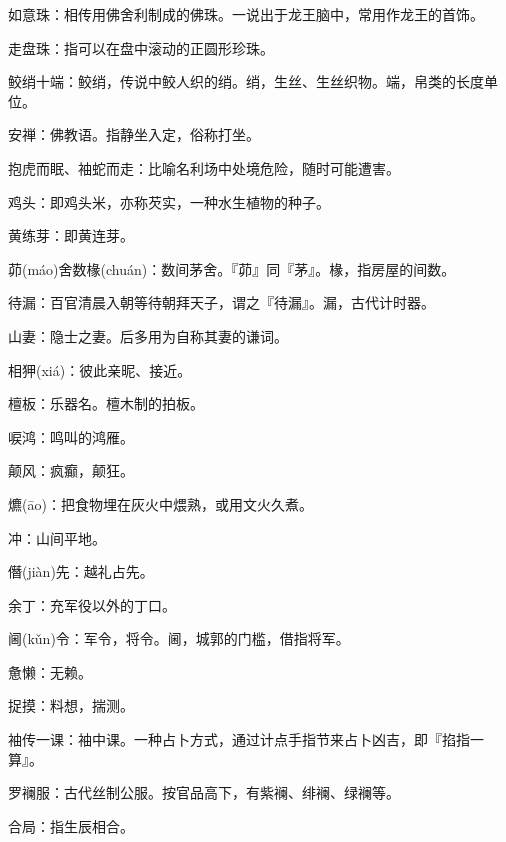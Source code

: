 \startbuffer[381]
如意珠：相传用佛舍利制成的佛珠。一说出于龙王脑中，常用作龙王的首饰。
\stopbuffer


\startbuffer[382]
走盘珠：指可以在盘中滚动的正圆形珍珠。
\stopbuffer


\startbuffer[383]
鲛绡十端：鲛绡，传说中鲛人织的绡。绡，生丝、生丝织物。端，帛类的长度单位。
\stopbuffer


\startbuffer[384]
安禅：佛教语。指静坐入定，俗称打坐。
\stopbuffer


\startbuffer[385]
抱虎而眠、袖蛇而走：比喻名利场中处境危险，随时可能遭害。
\stopbuffer


\startbuffer[386]
鸡头：即鸡头米，亦称芡实，一种水生植物的种子。
\stopbuffer


\startbuffer[387]
黄练芽：即黄连芽。
\stopbuffer


\startbuffer[388]
茆(máo)舍数椽(chuán)：数间茅舍。『茆』同『茅』。椽，指房屋的间数。
\stopbuffer


\startbuffer[389]
待漏：百官清晨入朝等待朝拜天子，谓之『待漏』。漏，古代计时器。
\stopbuffer


\startbuffer[390]
山妻：隐士之妻。后多用为自称其妻的谦词。
\stopbuffer


\startbuffer[391]
相狎(xiá)：彼此亲昵、接近。
\stopbuffer


\startbuffer[392]
檀板：乐器名。檀木制的拍板。
\stopbuffer


\startbuffer[393]
唳鸿：鸣叫的鸿雁。
\stopbuffer


\startbuffer[394]
颠风：疯癫，颠狂。
\stopbuffer


\startbuffer[395]
爊(āo)：把食物埋在灰火中煨熟，或用文火久煮。
\stopbuffer


\startbuffer[396]
冲：山间平地。
\stopbuffer


\startbuffer[397]
僭(jiàn)先：越礼占先。
\stopbuffer


\startbuffer[398]
余丁：充军役以外的丁口。
\stopbuffer


\startbuffer[399]
阃(kǔn)令：军令，将令。阃，城郭的门槛，借指将军。
\stopbuffer


\startbuffer[400]
惫懒：无赖。
\stopbuffer


\startbuffer[401]
捉摸：料想，揣测。
\stopbuffer


\startbuffer[402]
袖传一课：袖中课。一种占卜方式，通过计点手指节来占卜凶吉，即『掐指一算』。
\stopbuffer


\startbuffer[403]
罗襕服：古代丝制公服。按官品高下，有紫襕、绯襕、绿襕等。
\stopbuffer


\startbuffer[404]
合局：指生辰相合。
\stopbuffer


